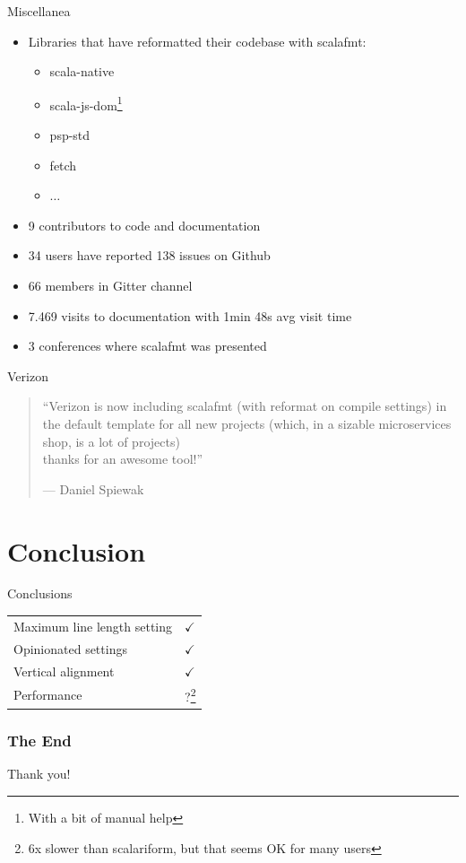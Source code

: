\documentclass[xcolor=dvipsnames]{beamer}
\theoremstyle{definition}
\begin{document}
\begin{frame}{Miscellanea}
  \begin{itemize}
    \item Libraries that have reformatted their codebase with scalafmt:
      \begin{itemize}
        \item scala-native
        \item scala-js-dom\footnote{With a bit of manual help}
        \item psp-std
        \item fetch
        \item $\ldots$
      \end{itemize}
    \item 9 contributors to code and documentation
    \item 34 users have reported 138 issues on Github
    \item 66 members in Gitter channel
    \item 7.469 visits to documentation with 1min 48s avg visit time
    \item 3 conferences where scalafmt was presented
  \end{itemize}
\end{frame}

\begin{frame}{Verizon}
  \begin{quote}
    ``Verizon is now including scalafmt (with reformat on compile settings) in
    the default template for all new projects (which, in a sizable
    microservices shop, is a lot of projects)\\
    thanks for an awesome tool!''

    \hfill --- Daniel Spiewak%
  \end{quote}
\end{frame}

\section{Conclusion} %
\label{sec:Conclusion}

\begin{frame}{Conclusions}
  \begin{table}
    \centering
    \begin{tabular}{ll}
      Maximum line length setting & $\checkmark$ \\
      Opinionated settings        & $\checkmark$ \\
      Vertical alignment          & $\checkmark$ \\
      Performance                 & ?\footnote{6x slower than scalariform,
                                               but that seems OK for many users}
    \end{tabular}
  \end{table}
\end{frame}



\begin{frame}[fragile]
  \frametitle{The End}
    \begin{center}
      \Huge
        Thank you!
    \end{center}
\end{frame}
\end{document}
